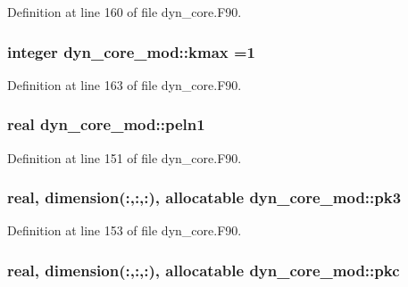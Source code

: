 Definition at line 160 of file dyn\-\_\-core.\-F90.

\subsubsection[{kmax}]{\setlength{\rightskip}{0pt plus 5cm}integer dyn\-\_\-core\-\_\-mod\-::kmax =1\hspace{0.3cm}{\ttfamily [private]}}\label{classdyn__core__mod_aabd06b880ef3e9eb74c6cde5107936e6}


Definition at line 163 of file dyn\-\_\-core.\-F90.

\subsubsection[{peln1}]{\setlength{\rightskip}{0pt plus 5cm}real dyn\-\_\-core\-\_\-mod\-::peln1\hspace{0.3cm}{\ttfamily [private]}}\label{classdyn__core__mod_a4a524216d71d2a5973c30736ce76deb4}


Definition at line 151 of file dyn\-\_\-core.\-F90.

\subsubsection[{pk3}]{\setlength{\rightskip}{0pt plus 5cm}real, dimension(\-:,\-:,\-:), allocatable dyn\-\_\-core\-\_\-mod\-::pk3\hspace{0.3cm}{\ttfamily [private]}}\label{classdyn__core__mod_a6d4525d6fbfd6de35414635dd9f0caea}


Definition at line 153 of file dyn\-\_\-core.\-F90.

\subsubsection[{pkc}]{\setlength{\rightskip}{0pt plus 5cm}real, dimension(\-:,\-:,\-:), allocatable dyn\-\_\-core\-\_\-mod\-::pkc\hspace{0.3cm}{\ttfamily [private]}}\label{classdyn__core__mod_ab8b896d9a395406f68b58a26d444f9bf}


